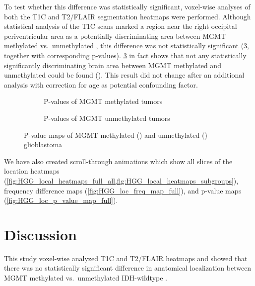 To test whether this difference was statistically significant, voxel-wise analyses of both the \gls{T1C} and \gls{T2}/\gls{FLAIR} segmentation heatmaps were performed.
Although statistical analysis of the \gls{T1C} scans marked a region near the right occipital periventricular area as a potentially discriminating area between \gls{MGMT} methylated vs.\ unmethylated , this difference was not statistically significant (\cref{fig:HGG_location_pvalue_map}, together with corresponding p-values).
\cref{fig:HGG_location_pvalue_map} in fact shows that not any statistically significantly discriminating brain area between \gls{MGMT} methylated and unmethylated  could be found ().
This result did not change after an additional analysis with correction for age as potential confounding factor.

\begin{figure}[htbp]
    \centering
    \begin{subfigure}[b]{\textwidth}
        \centering
        \caption{P-values of \gls{MGMT} methylated \glspl{tumor}}\label{fig:HGG_location_pvalue_methylated}
    \end{subfigure}
    \begin{subfigure}[b]{\textwidth}
        \centering
        \caption{P-values of \gls{MGMT} unmethylated \glspl{tumor}}\label{fig:HGG_location_pvalue_unmethylated}
    \end{subfigure}
    \caption{P-value maps of \acrshort{MGMT} methylated () and unmethylated () glioblastoma}\label{fig:HGG_location_pvalue_map}
\end{figure}

We have also created scroll-through animations which show all slices of the location heatmaps (\cref{fig:HGG_local_heatmaps_full_all,fig:HGG_local_heatmaps_subgroups}), frequency difference maps (\cref{fig:HGG_loc_freq_map_full}), and p-value maps (\cref{fig:HGG_loc_p_value_map_full}).


\section{Discussion}

This study voxel-wise analyzed \gls{T1C} and \gls{T2}/\gls{FLAIR} heatmaps and showed that there was no statistically significant difference in anatomical localization between \gls{MGMT} methylated vs.\ unmethylated \gls{IDH}-wildtype .

